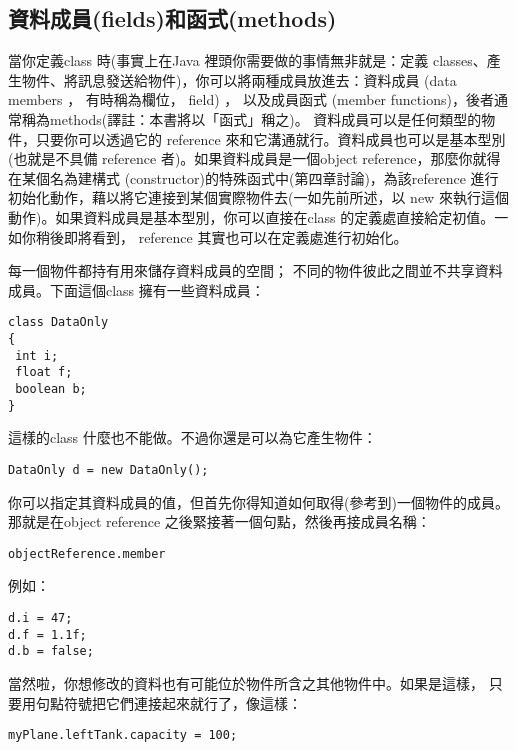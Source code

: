 \subsection{資料成員(fields)和函式(methods)}
當你定義class 時(事實上在Java 裡頭你需要做的事情無非就是：定義
classes、產生物件、將訊息發送給物件)，你可以將兩種成員放進去：資料成員
(data members ， 有時稱為欄位， field) ， 以及成員函式
(member functions)，後者通常稱為methods(譯註：本書將以「函式」稱之)。
資料成員可以是任何類型的物件，只要你可以透過它的
reference 來和它溝通就行。資料成員也可以是基本型別(也就是不具備
reference 者)。如果資料成員是一個object reference，那麼你就得在某個名為建構式
(constructor)的特殊函式中(第四章討論)，為該reference
進行初始化動作，藉以將它連接到某個實際物件去(一如先前所述，以
new 來執行這個動作)。如果資料成員是基本型別，你可以直接在class
的定義處直接給定初值。一如你稍後即將看到，
reference 其實也可以在定義處進行初始化。

每一個物件都持有用來儲存資料成員的空間；
不同的物件彼此之間並不共享資料成員。下面這個class 擁有一些資料成員：

\begin{Verbatim}[frame=single]
class DataOnly 
{
 int i;
 float f;
 boolean b;
}
\end{Verbatim}

這樣的class 什麼也不能做。不過你還是可以為它產生物件：

\begin{Verbatim}[frame=single]
DataOnly d = new DataOnly();
\end{Verbatim}

你可以指定其資料成員的值，但首先你得知道如何取得(參考到)一個物件的成員。
那就是在object reference 之後緊接著一個句點，然後再接成員名稱：

\begin{Verbatim}[frame=single]
objectReference.member
\end{Verbatim}

例如：

\begin{Verbatim}[frame=single]
d.i = 47;
d.f = 1.1f;
d.b = false;
\end{Verbatim}

當然啦，你想修改的資料也有可能位於物件所含之其他物件中。如果是這樣，
只要用句點符號把它們連接起來就行了，像這樣：

\begin{Verbatim}[frame=single]
myPlane.leftTank.capacity = 100;
\end{Verbatim}

